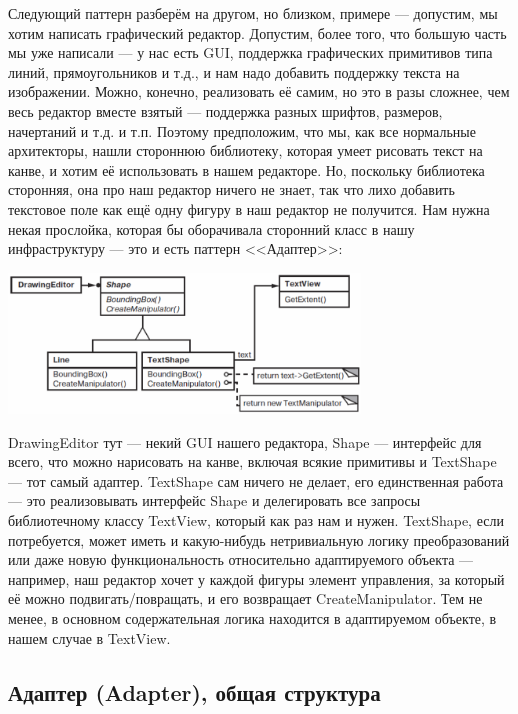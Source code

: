 \documentclass{../mcstext}
\begin{document}
Следующий паттерн разберём на другом, но близком, примере --- допустим, мы хотим написать графический редактор. Допустим, более того, что большую часть мы уже написали --- у нас есть GUI, поддержка графических примитивов типа линий, прямоугольников и т.д., и нам надо добавить поддержку текста на изображении. Можно, конечно, реализовать её самим, но это в разы сложнее, чем весь редактор вместе взятый --- поддержка разных шрифтов, размеров, начертаний и т.д. и т.п. Поэтому предположим, что мы, как все нормальные архитекторы, нашли стороннюю библиотеку, которая умеет рисовать текст на канве, и хотим её использовать в нашем редакторе. Но, поскольку библиотека сторонняя, она про наш редактор ничего не знает, так что лихо добавить текстовое поле как ещё одну фигуру в наш редактор не получится. Нам нужна некая прослойка, которая бы оборачивала сторонний класс в нашу инфраструктуру --- это и есть паттерн <<Адаптер>>:

\begin{center}
    \includegraphics[width=0.7\textwidth]{adapterExample.png}
\end{center}

DrawingEditor тут --- некий GUI нашего редактора, Shape --- интерфейс для всего, что можно нарисовать на канве, включая всякие примитивы и TextShape --- тот самый адаптер. TextShape сам ничего не делает, его единственная работа --- это реализовывать интерфейс Shape и делегировать все запросы библиотечному классу TextView, который как раз нам и нужен. TextShape, если потребуется, может иметь и какую-нибудь нетривиальную логику преобразований или даже новую функциональность относительно адаптируемого объекта --- например, наш редактор хочет у каждой фигуры элемент управления, за который её можно подвигать/повращать, и его возвращает CreateManipulator. Тем не менее, в основном содержательная логика находится в адаптируемом объекте, в нашем случае в TextView.

\subsection{Адаптер (Adapter), общая структура}
\end{document}
